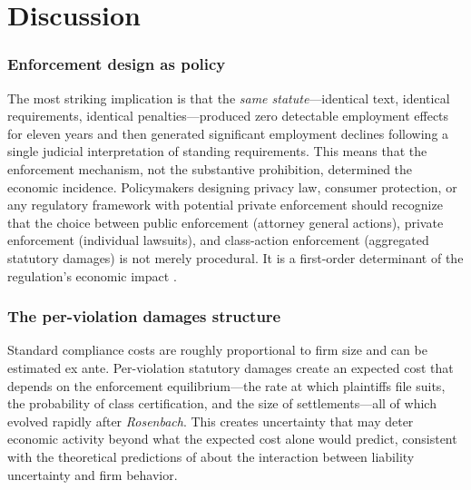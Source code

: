\documentclass[12pt]{article}
\begin{document}
\section{Discussion}
\label{sec:discussion}

\subsubsection*{Enforcement design as policy} The most striking implication is that the \textit{same statute}---identical text, identical requirements, identical penalties---produced zero detectable employment effects for eleven years and then generated significant employment declines following a single judicial interpretation of standing requirements. This means that the enforcement mechanism, not the substantive prohibition, determined the economic incidence. Policymakers designing privacy law, consumer protection, or any regulatory framework with potential private enforcement should recognize that the choice between public enforcement (attorney general actions), private enforcement (individual lawsuits), and class-action enforcement (aggregated statutory damages) is not merely procedural. It is a first-order determinant of the regulation's economic impact \citep{polinskys2000, coffee1986}.

\subsubsection*{The per-violation damages structure} Standard compliance costs are roughly proportional to firm size and can be estimated ex ante. Per-violation statutory damages create an expected cost that depends on the enforcement equilibrium---the rate at which plaintiffs file suits, the probability of class certification, and the size of settlements---all of which evolved rapidly after \textit{Rosenbach}. This creates uncertainty that may deter economic activity beyond what the expected cost alone would predict, consistent with the theoretical predictions of \citet{shavell1984} about the interaction between liability uncertainty and firm behavior.
\end{document}
